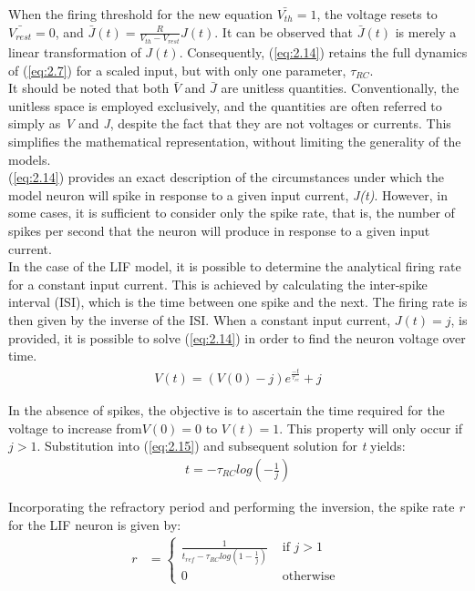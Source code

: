 \noindent When the firing threshold for the new equation $\bar{V_{th}} = 1$, the voltage resets to $\bar{V_{rest}} = 0$, and $\bar{J}(t) = \frac{R}{V_{th} - V_{rest}} J(t)$. It can be observed that $\bar{J}(t)$ is merely a linear transformation of $J(t)$. Consequently, (\ref{eq:2.14}) retains the full dynamics of (\ref{eq:2.7}) for a scaled input, but with only one parameter, $\tau_{RC}$. \\

\noindent It should be noted that both $\bar{V}$ and $\bar{J}$ are unitless quantities. Conventionally, the unitless space is employed exclusively, and the quantities are often referred to simply as \textit{V} and \textit{J}, despite the fact that they are not voltages or currents. This simplifies the mathematical representation, without limiting the generality of the models. \\

\noindent (\ref{eq:2.14}) provides an exact description of the circumstances under which the model neuron will spike in response to a given input current, \textit{J(t)}. However, in some cases, it is sufficient to consider only the spike rate, that is, the number of spikes per second that the neuron will produce in response to a given input current. \\

\noindent In the case of the LIF model, it is possible to determine the analytical firing rate for a constant input current. This is achieved by calculating the inter-spike interval (ISI), which is the time between one spike and the next. The firing rate is then given by the inverse of the ISI. When a constant input current, $J(t) = j$, is provided, it is possible to solve (\ref{eq:2.14}) in order to find the neuron voltage over time. 
\begin{align}
    V(t) = (V(0) - j)e^{\frac{-t}{\tau_{rc}}} + j \label{eq:2.15}
\end{align}

\noindent In the absence of spikes, the objective is to ascertain the time required for the voltage to increase from$ V(0) = 0$ to $V(t) = 1$. This property will only occur if $j > 1$. Substitution into (\ref{eq:2.15}) and subsequent solution for \textit{t} yields:
\begin{align}
    t = - \tau_{RC} log \left( - \frac{1}{j} \right) \label{eq:2.16}
\end{align}

\noindent Incorporating the refractory period and performing the inversion, the spike rate \textit{r} for the LIF neuron is given by:
\begin{align}
    r &= \begin{cases}
    \frac{1}{t_{ref} - \tau_{RC} log \left( 1 - \frac{1}{j} \right)} & \text{ if } j > 1 \\ 
    0 & \text{ otherwise }  
    \end{cases} \label{eq:2.17}
\end{align}


